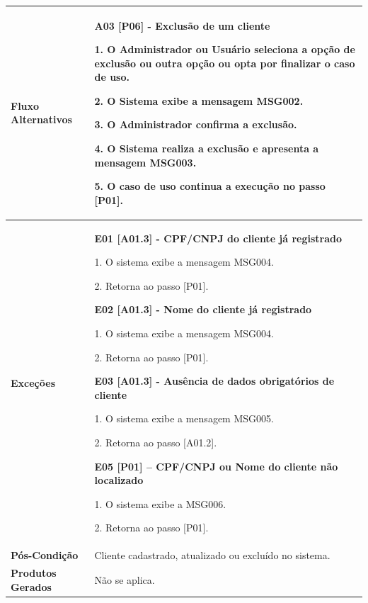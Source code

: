 \newpage
\begin{quadro}[!htbp]
	\begin{tabular}{  m{4cm}  m{11cm} }
        \textbf {Fluxo  Alternativos}  & \textbf {A03 [P06] - Exclusão de um cliente}
        
        1. O Administrador ou Usuário seleciona a opção de exclusão ou outra opção ou opta por finalizar o caso de uso.
        
        2. O Sistema exibe a mensagem MSG002.
        
        3. O Administrador confirma a exclusão.
        
        4. O Sistema realiza a exclusão e apresenta a mensagem MSG003.        
        
        5. O caso de uso continua a execução no passo [P01].\\ \hline
        
        \cellcolor{gray!10} \textbf {Exceções}            & \cellcolor{gray!10} \textbf {E01 [A01.3] - CPF/CNPJ do cliente já registrado}
        
        1. O sistema exibe a mensagem MSG004.
        
        2. Retorna ao passo [P01].
        
        \textbf {E02 [A01.3] - Nome do cliente já registrado}
        
        1. O sistema exibe a mensagem MSG004.
        
        2. Retorna ao passo [P01].
        
        \textbf {E03 [A01.3] - Ausência de dados obrigatórios de cliente}
        
        1. O sistema exibe a mensagem MSG005.
        
        2. Retorna ao passo [A01.2].
        
        \textbf {E05 [P01] – CPF/CNPJ ou Nome do cliente não localizado}
        
        1. O sistema exibe a MSG006.
        
        2. Retorna ao passo [P01].  \\ \hline
		
        \textbf {Pós-Condição}        & Cliente cadastrado, atualizado ou excluído no sistema.  \\ \hline
  	
        \cellcolor{gray!10} \textbf {Produtos Gerados}    & \cellcolor{gray!10} Não se aplica.  \\ \hline
        

\end{tabular}
\end{quadro}
